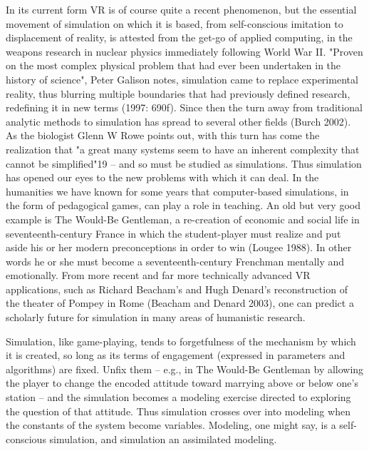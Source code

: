 In its current form VR is of course quite a recent phenomenon, but the essential movement of simulation on which it is based, from self-conscious imitation to displacement of reality, is attested from the get-go of applied computing, in the weapons research in nuclear physics immediately following World War II. "Proven on the most complex physical problem that had ever been undertaken in the history of science", Peter Galison notes, simulation came to replace experimental reality, thus blurring multiple boundaries that had previously defined research, redefining it in new terms (1997: 690f). Since then the turn away from traditional analytic methods to simulation has spread to several other fields (Burch 2002). As the biologist Glenn W Rowe points out, with this turn has come the realization that "a great many systems seem to have an inherent complexity that cannot be simplified"19 – and so must be studied as simulations. Thus simulation has opened our eyes to the new problems with which it can deal. In the humanities we have known for some years that computer-based simulations, in the form of pedagogical games, can play a role in teaching. An old but very good example is The Would-Be Gentleman, a re-creation of economic and social life in seventeenth-century France in which the student-player must realize and put aside his or her modern preconceptions in order to win (Lougee 1988). In other words he or she must become a seventeenth-century Frenchman mentally and emotionally. From more recent and far more technically advanced VR applications, such as Richard Beacham's and Hugh Denard's reconstruction of the theater of Pompey in Rome (Beacham and Denard 2003), one can predict a scholarly future for simulation in many areas of humanistic research.

Simulation, like game-playing, tends to forgetfulness of the mechanism by which it is created, so long as its terms of engagement (expressed in parameters and algorithms) are fixed. Unfix them – e.g., in The Would-Be Gentleman by allowing the player to change the encoded attitude toward marrying above or below one's station – and the simulation becomes a modeling exercise directed to exploring the question of that attitude. Thus simulation crosses over into modeling when the constants of the system become variables. Modeling, one might say, is a self-conscious simulation, and simulation an assimilated modeling.


